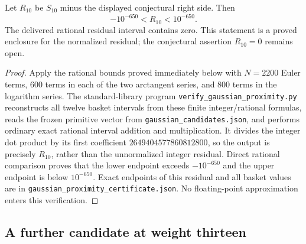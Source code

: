 \begin{proposition}\label{prop:S10-proximity}
Let $R_{10}$ be $S_{10}$ minus the displayed conjectural right side.
Then
\[
 -10^{-650}<R_{10}<10^{-650}.
\]
The delivered rational residual interval contains zero.  This statement
is a proved enclosure for the normalized residual; the conjectural
assertion $R_{10}=0$ remains open.
\end{proposition}
\begin{proof}
Apply the rational bounds proved immediately below with $N=2200$ Euler
terms, 600 terms in each of the two arctangent series, and 800 terms in
the logarithm series.  The standard-library program
\texttt{verify\_gaussian\_proximity.py} reconstructs all twelve basket
intervals from these finite integer/rational formulas, reads the frozen
primitive vector from \texttt{gaussian\_candidates.json}, and performs
ordinary exact rational interval addition and multiplication.  It
divides the integer dot product by its first coefficient
$2649404577860812800$, so the output is precisely $R_{10}$, rather than
the unnormalized integer residual.  Direct rational comparison proves
that the lower endpoint exceeds $-10^{-650}$ and the upper endpoint is
below $10^{-650}$.  Exact endpoints of this residual and all basket
values are in \texttt{gaussian\_proximity\_certificate.json}.
No floating-point approximation enters this verification.
\end{proof}

\subsection{A further candidate at weight thirteen}

